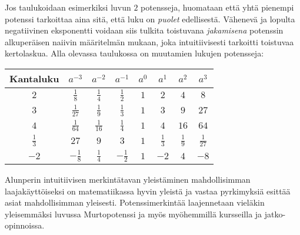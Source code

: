 \begin{esimerkki}
Jos taulukoidaan esimerkiksi luvun $2$ potensseja, huomataan että yhtä pienempi potenssi tarkoittaa aina sitä, että luku on \emph{puolet} edellisestä. Vähenevä ja lopulta negatiivinen eksponentti voidaan siis tulkita toistuvana \textit{jakamisena} potenssin alkuperäisen naiivin määritelmän mukaan, joka intuitiivisesti tarkoitti toistuvaa kertolaskua. Alla olevassa taulukossa on muutamien lukujen potensseja:
  
\begin{tabular}{c|c c c c c c c}
Kantaluku & $a^{-3}$ & $a^{-2}$ & $a^{-1}$ & $a^0$ & $a^1$ & $a^2$ & $a^3$ \\
\hline
$2$ & $\frac{1}{8}$ & $\frac{1}{4}$ & $\frac{1}{2}$ & $1$ & $2$ & $4$ & $8$ \\
$3$ & $\frac{1}{27}$ & $\frac{1}{9}$ & $\frac{1}{3}$ & $1$ & $3$ & $9$ & $27$ \\
$4$ & $\frac{1}{64}$ & $\frac{1}{16}$ & $\frac{1}{4}$ & $1$ & $4$ & $16$ & $64$ \\
$\frac{1}{3}$ & $27$ & $9$ & $3$ & $1$ & $\frac{1}{3}$ & $\frac{1}{9}$ & $\frac{1}{27}$ \\
$-2$ & $-\frac{1}{8}$ & $\frac{1}{4}$ & $-\frac{1}{2}$ & $1$ & $-2$ & $4$ & $-8$
\end{tabular}
\end{esimerkki}

Alunperin intuitiivisen merkintätavan yleistäminen mahdollisimman laajakäyttöiseksi on matematiikassa hyvin yleistä ja vastaa pyrkimyksiä esittää asiat mahdollisimman yleisesti. Potenssimerkintää laajennetaan vieläkin yleisemmäksi luvussa Murtopotenssi ja myös myöhemmillä kursseilla ja jatko-opinnoissa. %